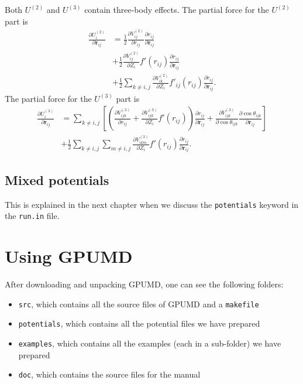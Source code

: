 \documentclass[12pt,a4paper]{report}
\newcommand{\vect}[1]{\boldsymbol{#1}}
\begin{document}
Both $U^{(2)}$ and $U^{(3)}$ contain three-body effects. The partial force for the $U^{(2)}$ part is
\begin{align}
\frac{\partial U^{(2)}_i}{\partial \vect{r}_{ij}}
&= \frac{1}{2} \frac{\partial V^{(2)}_{ij}}{\partial r_{ij}} \frac{\partial r_{ij}}{\partial \vect{r}_{ij}} \nonumber \\
&+ \frac{1}{2} \frac{\partial V^{(2)}_{ij}}{\partial Z_{i}} f'(r_{ij}) \frac{\partial r_{ij}}{\partial \vect{r}_{ij}} \nonumber \\
&+ \frac{1}{2} \sum_{k\neq i,j} \frac{\partial V^{(2)}_{ik}}{\partial Z_{i}} f'_{ij}(r_{ij}) \frac{\partial r_{ij}}{\partial \vect{r}_{ij}}.
\end{align}
The partial force for the $U^{(3)}$ part is
\begin{align}
\frac{\partial U^{(3)}_i}{\partial \vect{r}_{ij}}
&= \sum_{k\neq i,j} 
\left[
\left( \frac{\partial V^{(3)}_{ijk}}{\partial r_{ij}} + \frac{\partial V^{(3)}_{ijk}}{\partial Z_{i}} f'(r_{ij} ) \right)
\frac{\partial r_{ij}}{\partial \vect{r}_{ij}}
+ \frac{\partial V^{(3)}_{ijk}}{\partial \cos\theta_{ijk}} \frac{\partial \cos\theta_{ijk}}{\partial \vect{r}_{ij}} 
\right]
 \nonumber \\
&+ \frac{1}{2} \sum_{k\neq i,j} \sum_{m\neq i,j} \frac{\partial V^{(3)}_{ikm}}{\partial Z_{i}} f'(r_{ij}) \frac{\partial r_{ij}}{\partial \vect{r}_{ij}}.
\end{align}


\section{Mixed potentials}

This is explained in the next chapter when we discuss the \verb"potentials" keyword in the \verb"run.in" file.


\chapter{Using GPUMD \label{chapter:usage}}

After downloading and unpacking GPUMD, one can see the following folders:
\begin{itemize}
\item \verb"src", which contains all the source files of GPUMD and a \verb"makefile"
\item \verb"potentials", which contains all the potential files we have prepared
\item \verb"examples", which contains all the examples (each in a sub-folder) we have prepared
\item \verb"doc", which contains the source files for the manual
\end{itemize}
\end{document}

